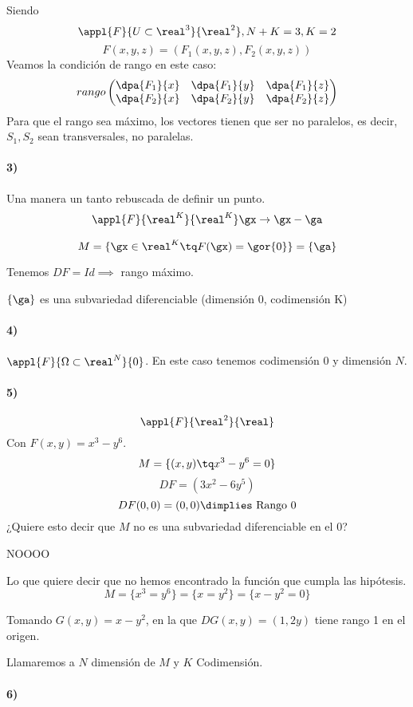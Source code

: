   Siendo \[\appl{F}{U\subset\real^3}{\real^2}, N+K=3,K=2\]\[F(x,y,z) = (F_1(x,y,z),F_2(x,y,z))\]
  Veamos la condición de rango en este caso:
  \[rango \begin{pmatrix} \dpa{F_1}{x}&\dpa{F_1}{y}&\dpa{F_1}{z}\\\dpa{F_2}{x}&\dpa{F_2}{y}&\dpa{F_2}{z}\end{pmatrix}\]
  Para que el rango sea máximo, los vectores tienen que ser no paralelos, es decir, $S_1, S_2$ sean transversales, no paralelas.
  
  \paragraph{3)} Una manera un tanto rebuscada de definir un punto.
 \begin{gather*}
 \appl{F}{\real^K}{\real^K}
 \gx \rightarrow \gx - \ga
 \end{gather*}  
 
 \[M = \{\gx \in \real^K \tq F(\gx) = \gor{0}\} = \{\ga\}\]
 
 Tenemos $DF = Id \implies $ rango máximo.
 
 $\{\ga\}$ es una subvariedad diferenciable (dimensión 0, codimensión K)
 
 \paragraph{4)} $\appl{F}{\Omega\subset\real^N}{0}$. En este caso tenemos codimensión $0$ y dimensión $N$.
 
\paragraph{5)}
   \[\appl{F}{\real^2}{\real}\]  
  Con $F(x,y) = x^3 - y^6$.
  \[M = \{(x,y) \tq x^3-y^6 = 0\}\]
  \[DF = (3x^2-6y^5)\]
  \[DF(0,0) = (0,0) \dimplies \text{ Rango 0}\]
  ¿Quiere esto decir que $M$ no es una subvariedad diferenciable en el 0?
  
  NOOOO
  
  Lo que quiere decir que no hemos encontrado la función que cumpla las hipótesis.
  \[M = \{x^3=y^6\} = \{x = y^2\}  = \{x-y^2 = 0\}\]
  
  Tomando $G(x,y) = x-y^2$, en la que $DG(x,y) = (1,2y)$ tiene rango 1 en el origen.
  

  Llamaremos a $N$ dimensión de $M$ y $K$ Codimensión.
 
  \paragraph{6)}
  
